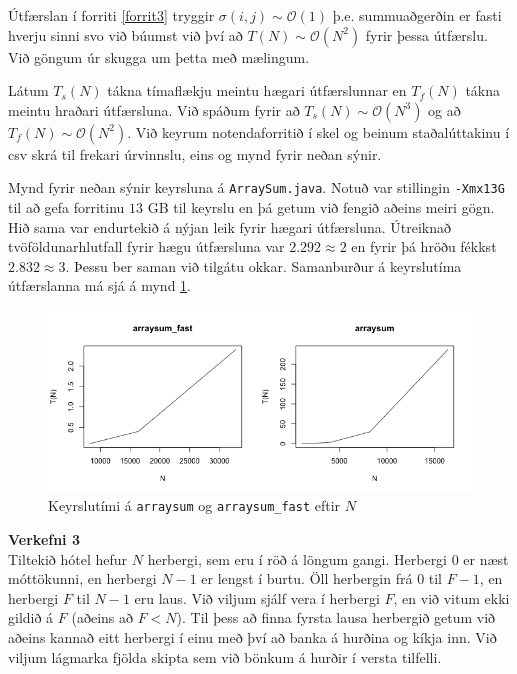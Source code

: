 \documentclass[12pt, a4paper, hidelinks]{article}
\begin{document}
\noindent
Útfærslan í forriti \ref{forrit3} tryggir $\sigma(i, j) \sim \mathcal O(1)$ þ.e. summuaðgerðin er fasti hverju sinni svo við
búumst við því að $T(N) \sim \mathcal O(N^2)$ fyrir þessa útfærslu. Við göngum úr skugga um þetta með mælingum.

Látum $T_s(N)$ tákna tímaflækju meintu hægari útfærslunnar en $T_f(N)$ tákna meintu
hraðari útfærsluna. Við spáðum fyrir að $T_s(N) \sim \mathcal O(N^3)$ og að $T_f(N) \sim \mathcal O(N^2)$.
Við keyrum notendaforritið í skel og beinum staðalúttakinu í csv skrá til frekari úrvinnslu, eins og mynd fyrir neðan sýnir.

Mynd fyrir neðan sýnir keyrsluna á \texttt{ArraySum.java}. Notuð var stillingin \texttt{-Xmx13G} til að gefa forritinu $13$ GB
til keyrslu en þá getum við fengið aðeins meiri gögn. Hið sama var endurtekið á nýjan leik fyrir hægari útfærsluna. Útreiknað tvöföldunarhlutfall
fyrir hægu útfærsluna var $2.292 \approx 2$ en fyrir þá hröðu fékkst $2.832 \approx 3$. Þessu ber saman við tilgátu okkar.
Samanburður á keyrslutíma útfærslanna má sjá á mynd \ref{mynd3}.

\begin{figure}[ht!]
    \centering
    \includegraphics[width=\textwidth]{img/speed_comparison_nonlog.png}
    \caption{Keyrslutími á \texttt{arraysum} og \texttt{arraysum\_fast} eftir $N$}
    \label{mynd3}
\end{figure}


\newpage
\noindent
\textbf{\large Verkefni 3} \medskip \\
Tiltekið hótel hefur $N$ herbergi, sem eru í röð á löngum gangi. Herbergi $0$ er næst móttökunni, en herbergi $N-1$ er lengst í burtu.
Öll herbergin frá $0$ til $F-1$, en herbergi $F$ til $N-1$ eru laus. Við viljum sjálf vera í herbergi $F$, en við vitum ekki gildið á $F$
(aðeins að $F < N$). Til þess að finna fyrsta lausa herbergið getum við aðeins kannað eitt herbergi í einu með því að banka á hurðina og kíkja
inn. Við viljum lágmarka fjölda skipta sem við bönkum á hurðir í versta tilfelli.
\end{document}
